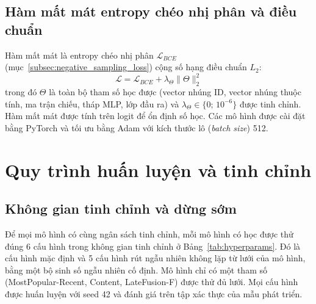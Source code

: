 \subsection{Hàm mất mát entropy chéo nhị phân và điều chuẩn}
\label{subsec:bce_regularization}

Hàm mất mát là entropy chéo nhị phân $\mathcal{L}_{BCE}$ (mục~\ref{subsec:negative_sampling_loss}) cộng số hạng điều chuẩn $L_2$:
\begin{equation*}
    \mathcal{L} = \mathcal{L}_{BCE} + \lambda_\Theta \|\Theta\|_2^2
\end{equation*}
trong đó $\Theta$ là toàn bộ tham số học được (vector nhúng ID, vector nhúng thuộc tính, ma trận chiếu, tháp MLP, lớp đầu ra) và $\lambda_\Theta \in \{0;\, 10^{-6}\}$ được tinh chỉnh. Hàm mất mát được tính trên logit để ổn định số học. Các mô hình được cài đặt bằng PyTorch \parencite{paszke2019pytorch} và tối ưu bằng Adam \parencite{kingma2014adam} với kích thước lô (\textit{batch size}) 512.

\section{Quy trình huấn luyện và tinh chỉnh}
\label{sec:training_pipeline}

\subsection{Không gian tinh chỉnh và dừng sớm}
\label{subsec:hyperparameters_setup}

Để mọi mô hình có cùng ngân sách tinh chỉnh, mỗi mô hình có học được thử đúng 6 cấu hình trong không gian tinh chỉnh ở Bảng~\ref{tab:hyperparams}. Đó là cấu hình mặc định và 5 cấu hình rút ngẫu nhiên không lặp từ lưới của mô hình, bằng một bộ sinh số ngẫu nhiên cố định. Mô hình chỉ có một tham số (MostPopular-Recent, Content, LateFusion-F) được thử đủ lưới. Mọi cấu hình được huấn luyện với seed 42 và đánh giá trên tập xác thực của mẫu phát triển.

